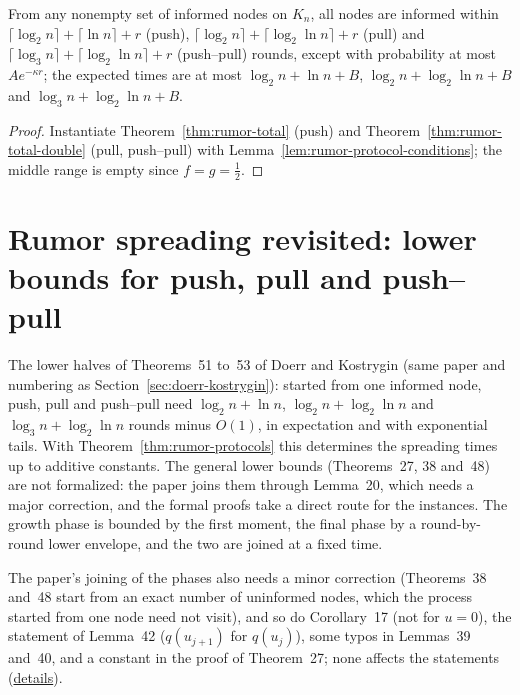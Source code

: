 \begin{theorem}\label{thm:rumor-protocols}
\leanok{}
From any nonempty set of informed nodes on $K_n$, all nodes are informed within
$\lceil\log_2n\rceil+\lceil\ln n\rceil+r$ (push), $\lceil\log_2n\rceil+\lceil\log_2\ln n\rceil+r$
(pull) and $\lceil\log_3n\rceil+\lceil\log_2\ln n\rceil+r$ (push--pull) rounds, except with
probability at most $Ae^{-\kappa r}$; the expected times are at most $\log_2n+\ln n+B$,
$\log_2n+\log_2\ln n+B$ and $\log_3n+\log_2\ln n+B$.
\end{theorem}
\begin{proof}\leanok
Instantiate Theorem~\ref{thm:rumor-total} (push) and Theorem~\ref{thm:rumor-total-double}
(pull, push--pull) with Lemma~\ref{lem:rumor-protocol-conditions}; the middle range is empty since
$f=g=\frac12$.
\end{proof}

\section{Rumor spreading revisited: lower bounds for push, pull and push--pull}\label{sec:doerr-kostrygin-lower}
The lower halves of Theorems~51 to~53 of Doerr and Kostrygin (same paper and numbering as
Section~\ref{sec:doerr-kostrygin}): started from one informed node, push, pull and push--pull
need $\log_2n+\ln n$, $\log_2n+\log_2\ln n$ and $\log_3n+\log_2\ln n$ rounds minus $O(1)$, in
expectation and with exponential tails. With Theorem~\ref{thm:rumor-protocols} this determines the
spreading times up to additive constants. The general lower bounds (Theorems~27, 38 and~48) are
not formalized: the paper joins them through Lemma~20, which needs a major correction, and the
formal proofs take a direct route for the instances. The growth phase is bounded by the first
moment, the final phase by a round-by-round lower envelope, and the two are joined at a fixed time.

The paper's joining of the phases also needs a minor correction (Theorems~38 and~48 start from an
exact number of uninformed nodes, which the process started from one node need not visit), and so
do Corollary~17 (not for $u=0$), the statement of Lemma~42 ($q(u_{j+1})$ for $q(u_j)$), some typos
in Lemmas~39 and~40, and a constant in the proof of Theorem~27; none affects the statements
(\href{https://github.com/formal-dynamics/leanamics/blob/main/epidemics/FORMALIZATION_DIFFERENCES.md#lower-bounds-of-theorems-51-to-53-lowerlean}{details}).

